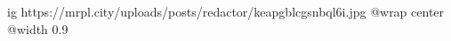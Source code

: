  
 
 
 
 

\ifcmt
  ig https://mrpl.city/uploads/posts/redactor/keapgblcgsnbql6i.jpg
  @wrap center
  @width 0.9
\fi
